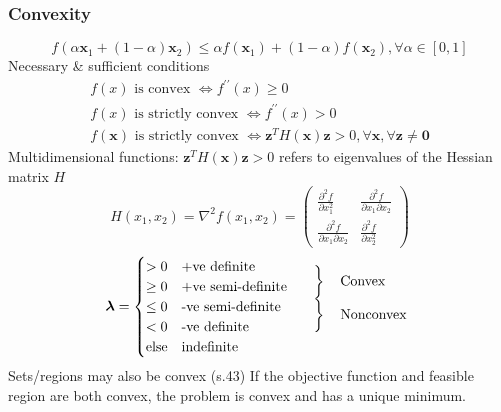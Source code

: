 \documentclass[a4paper,twocolumn,10pt]{article}
\begin{document}
\subsubsection{Convexity}
\begin{equation*}
    f\left(\alpha \boldsymbol{x}_{1}+(1-\alpha) \boldsymbol{x}_{2}\right) \leq \alpha f\left(\boldsymbol{x}_{1}\right)+(1-\alpha) f\left(\boldsymbol{x}_{2}\right), \forall \alpha \in[0,1]
\end{equation*}
Necessary \& sufficient conditions
\begin{gather*}
    f(x) \text { is convex } \Leftrightarrow f^{\prime \prime}(x) \geq 0 \\
    f(x) \text { is strictly convex } \Leftrightarrow f^{\prime \prime}(x)>0\\
    f(\boldsymbol{x}) \text { is strictly convex } \Leftrightarrow \mathbf{z}^{T} H(\boldsymbol{x}) \mathbf{z}>0, \forall \boldsymbol{x}, \forall \boldsymbol{z} \neq \mathbf{0}
\end{gather*}
Multidimensional functions: $\mathbf{z}^{T} H(\boldsymbol{x}) \mathbf{z}>0$ refers to eigenvalues of the Hessian matrix $H$
\begin{equation}
    H\left(x_{1}, x_{2}\right)=\nabla^{2} f\left(x_{1}, x_{2}\right)=\left(\begin{array}{cc}
    \frac{\partial^{2} f}{\partial x_{1}^{2}} & \frac{\partial^{2} f}{\partial x_{1} \partial x_{2}} \\
    \frac{\partial^{2} f}{\partial x_{1} \partial x_{2}} & \frac{\partial^{2} f}{\partial x_{2}^{2}}
    \end{array}\right)
\end{equation}
\begin{equation}
    \boldsymbol{\lambda} = \begin{cases}
        > 0 & \text{+ve definite} \\
        \geq 0 & \text{+ve semi-definite} \\
        \leq 0 & \text{-ve semi-definite} \\
        < 0 & \text{-ve definite} \\
        \text{else} & \text{indefinite}
    \end{cases}
    \begin{array}{l}
        \left.\begin{array}{l}\mathstrut\\\mathstrut\end{array}\right\}\quad\text{Convex}\\
        \left.\begin{array}{l}\mathstrut\\\mathstrut\end{array}\right\}\quad\text{Nonconvex}\\
        \mathstrut
    \end{array}
\end{equation}
Sets/regions may also be convex (s.43)
If the objective function and feasible region are both convex, the problem is convex and has a unique minimum.
\end{document}

